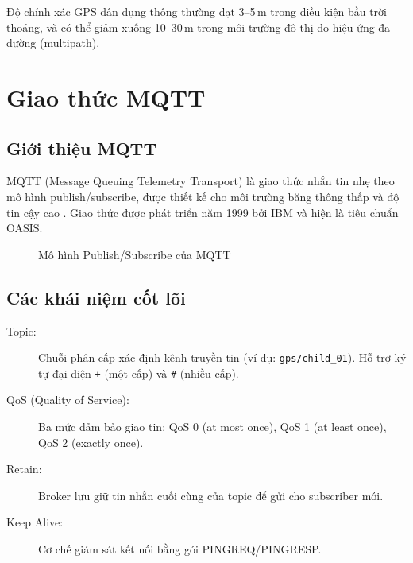 Độ chính xác GPS dân dụng thông thường đạt 3--5\,m trong điều kiện bầu trời thoáng, và có thể giảm xuống 10--30\,m trong môi trường đô thị do hiệu ứng đa đường (multipath).

\section{Giao thức MQTT}

\subsection{Giới thiệu MQTT}

MQTT (Message Queuing Telemetry Transport) là giao thức nhắn tin nhẹ theo mô hình publish/subscribe, được thiết kế cho môi trường băng thông thấp và độ tin cậy cao \cite{banks2019mqtt}. Giao thức được phát triển năm 1999 bởi IBM và hiện là tiêu chuẩn OASIS.

\begin{figure}[H]
\centering
{}
\caption{Mô hình Publish/Subscribe của MQTT}
\label{fig:mqtt_model}
\end{figure}

\subsection{Các khái niệm cốt lõi}

\begin{description}
  \item[Topic:] Chuỗi phân cấp xác định kênh truyền tin (ví dụ: \texttt{gps/child\_01}). Hỗ trợ ký tự đại diện \texttt{+} (một cấp) và \texttt{\#} (nhiều cấp).
  \item[QoS (Quality of Service):] Ba mức đảm bảo giao tin: QoS 0 (at most once), QoS 1 (at least once), QoS 2 (exactly once).
  \item[Retain:] Broker lưu giữ tin nhắn cuối cùng của topic để gửi cho subscriber mới.
  \item[Keep Alive:] Cơ chế giám sát kết nối bằng gói PINGREQ/PINGRESP.
\end{description}

